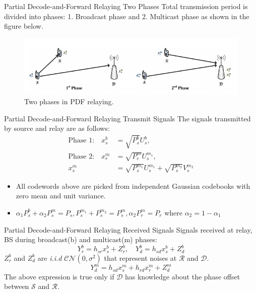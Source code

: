 \documentclass{beamer}
\begin{document}
\begin{frame}{Partial Decode-and-Forward Relaying} {Two Phases}
Total transmission period is divided into phases: 1. Broadcast phase and 2. Multicast phase as shown in the figure below.
\begin{figure}
\centering
\includegraphics[width=\textwidth]{figures/pdfRelaying.png}
  \caption{Two phases in PDF relaying.}
\end{figure}
\end{frame}

\begin{frame}{Partial Decode-and-Forward Relaying} {Transmit Signals}
\vspace{-1cm}
The signals transmitted by source and relay are as follows:
\begin{align*}
\text{Phase 1:}\quad x^b_s &= \sqrt{P_s^b} U_s^b, \\
\text{Phase 2:}\quad x_r^m &= \sqrt{P_r^m}U_s^{m_1}, \\ 
 x^m_s &= \sqrt{P_s^{m_1}}U_s^{m_1} + \sqrt{P_s^{m_2}}V_s^{m_2} 
\end{align*}
\vspace{-0.5cm}
\begin{itemize}
\item All codewords above are picked from independent Gaussian codebooks with zero mean and unit variance.
\item $\alpha_1 P_s^b + \alpha_2 P_s^m = P_s, P_s^{m_1}+P_s^{m_2} = P_s^m,  \alpha_2P_r^m = P_r$
where $\alpha_2 = 1-\alpha_1$
\end{itemize}
\end{frame}

\begin{frame}{Partial Decode-and-Forward Relaying} {Received Signals}
\vspace{-1cm}
Signals received at relay, BS during broadcast(b) and multicast(m) phases:
\begin{equation*}
Y_r^b = h_{sr}x^b_s + Z_r^b , \quad Y_d^b = h_{sd}x^b_s + Z_d^b
\end{equation*}
$Z_r^b$ and $Z_d^b$ are \textit{i.i.d} $\mathcal{CN}(0,\sigma^2)$ that represent noises at $\mathcal{R}$ and $\mathcal{D}$. \\
\begin{equation*}
Y_d^m = h_{sd}x^m_s + h_{rd}x_r^m + Z_d^m
\end{equation*}
The above expression is true only if $\mathcal{D}$ has knowledge about the phase offset between $\mathcal{S}$ and $\mathcal{R}$. 
\end{frame}
\end{document}
